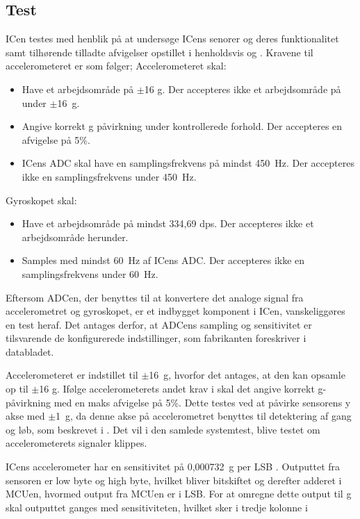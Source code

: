 \subsection{Test}
ICen testes med henblik på at undersøge ICens senorer og deres funktionalitet samt tilhørende tilladte afvigelser opstillet i henholdsvis  og . Kravene til accelerometeret er som følger;
Accelerometeret skal:
\begin{itemize}
	\item Have et arbejdsområde på $\pm$16 g. Der accepteres ikke et arbejdsområde på under $\pm$16~g.
	\item Angive korrekt g påvirkning under kontrollerede forhold. Der accepteres en afvigelse på 5\%.
	\item ICens ADC skal have en samplingsfrekvens på mindst 450~Hz. Der accepteres ikke en samplingsfrekvens under 450~Hz.
\end{itemize}
Gyroskopet skal:
\begin{itemize}
	\item Have et arbejdsområde på mindst 334,69 dps. Der accepteres ikke et arbejdsområde herunder.
	\item Samples med mindst 60~Hz af ICens ADC. Der accepteres ikke en samplingsfrekvens under 60~Hz.
\end{itemize}
Eftersom ADCen, der benyttes til at konvertere det analoge signal fra accelerometret og gyroskopet, er et indbygget komponent i ICen, vanskeliggøres en test heraf. Det antages derfor, at ADCens sampling og sensitivitet er tilsvarende de konfigurerede indstillinger, som fabrikanten foreskriver i databladet.

Accelerometeret er indstillet til $\pm$16~g, hvorfor det antages, at den kan opsamle op til $\pm$16 g. Ifølge accelerometerets andet krav i  skal det angive korrekt g-påvirkning med en maks afvigelse på 5\%. Dette testes ved at påvirke sensorens y akse med $\pm$1~g, da denne akse på accelerometret benyttes til detektering af gang og løb, som beskrevet i . Det vil i den samlede systemtest, blive testet om accelerometerets signaler klippes. 

ICens accelerometer har en sensitivitet på 0,000732~g per LSB \citep{STMicroelectronics2016}. Outputtet fra sensoren er low byte og high byte, hvilket bliver bitskiftet og derefter adderet i MCUen, hvormed output fra MCUen er i LSB. For at omregne dette output til g skal outputtet ganges med sensitiviteten, hvilket sker i tredje kolonne i 

